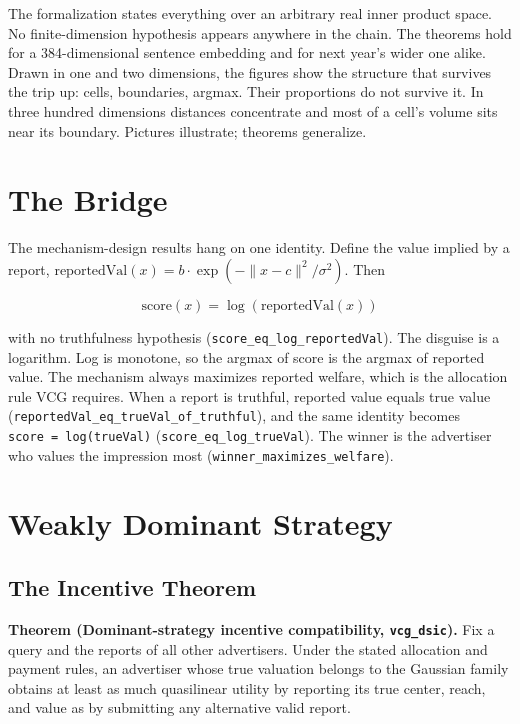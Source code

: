 The formalization states everything over an arbitrary real inner product
space. No finite-dimension hypothesis appears anywhere in the chain. The
theorems hold for a 384-dimensional sentence embedding and for next
year's wider one alike. Drawn in one and two dimensions, the figures
show the structure that survives the trip up: cells, boundaries, argmax.
Their proportions do not survive it. In three hundred dimensions
distances concentrate and most of a cell's volume sits near its
boundary. Pictures illustrate; theorems generalize.

\section{The Bridge}\label{the-bridge}

The mechanism-design results hang on one identity. Define the value
implied by a report,
\(\mathrm{reportedVal}(x) = b \cdot  \exp(-\|x - c\|^{2}/\sigma ^{2})\).
Then

\[\mathrm{score}(x) = \log(\mathrm{reportedVal}(x))\]

with no truthfulness hypothesis (\texttt{score\_eq\_log\_reportedVal}).
The disguise is a logarithm. Log is monotone, so the argmax of score is
the argmax of reported value. The mechanism always maximizes reported
welfare, which is the allocation rule VCG requires. When a report is
truthful, reported value equals true value
(\texttt{reportedVal\_eq\_trueVal\_of\_truthful}), and the same identity
becomes \texttt{score\ =\ log(trueVal)}
(\texttt{score\_eq\_log\_trueVal}). The winner is the advertiser who
values the impression most (\texttt{winner\_maximizes\_welfare}).

\section{Weakly Dominant Strategy}\label{weakly-dominant-strategy}

\subsection{The Incentive Theorem}\label{the-incentive-theorem}

\textbf{Theorem (Dominant-strategy incentive compatibility,
\texttt{vcg\_dsic}).} Fix a query and the reports of all other
advertisers. Under the stated allocation and payment rules, an
advertiser whose true valuation belongs to the Gaussian family obtains
at least as much quasilinear utility by reporting its true center,
reach, and value as by submitting any alternative valid report.

